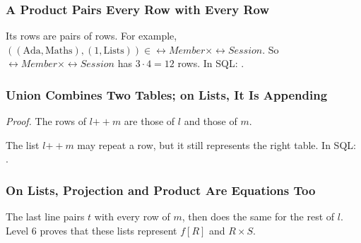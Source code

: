 \documentclass{ltx-talk}
\begin{document}
\begin{frame}
  \frametitle{A Product Pairs Every Row with Every Row}
  Its rows are pairs of rows. For example,
  $((\text{Ada}, \text{Maths}), (1, \text{Lists})) \in \rel{Member} \times
  \rel{Session}$.
  So $\rel{Member} \times \rel{Session}$ has $3 \cdot 4 = 12$ rows. In SQL:
  .
\end{frame}

\begin{frame}
  \frametitle{Union Combines Two Tables; on Lists, It Is Appending}
  \emph{Proof.} The rows of $l \mathbin{+\!\!+} m$ are those of $l$ and
  those of $m$. \proofend
  \par\medskip
  The list $l \mathbin{+\!\!+} m$ may repeat a row, but it still
  represents the right table. In SQL: .
\end{frame}

\begin{frame}
  \frametitle{On Lists, Projection and Product Are Equations Too}
  The last line pairs $t$ with every row of $m$, then does the same for
  the rest of $l$. Level 6 proves that these lists represent $f[R]$ and
  $R \times S$.
\end{frame}

\end{document}
